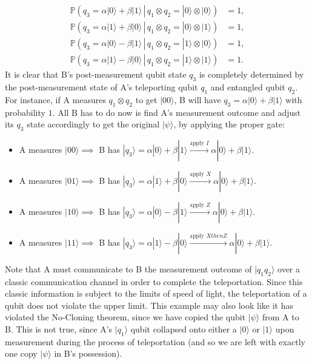\documentclass{article}
\theoremstyle{definition}
\begin{document}
\begin{enumerate}
    \begin{align*}
      \mathbb{P}(q_3 = \alpha|0\rangle + \beta |1\rangle \,|\, q_1 \otimes q_2 = |0\rangle \otimes |0\rangle) &= 1, \\
      \mathbb{P}(q_3 = \alpha|1\rangle + \beta |0\rangle \,|\, q_1 \otimes q_2 = |0\rangle \otimes |1\rangle) &= 1, \\
      \mathbb{P}(q_3 = \alpha|0\rangle - \beta |1\rangle \,|\, q_1 \otimes q_2 = |1\rangle \otimes |0\rangle) &= 1, \\
      \mathbb{P}(q_3 = \alpha|1\rangle - \beta |0\rangle \,|\, q_1 \otimes q_2 = |1\rangle \otimes |1\rangle) &= 1.
    \end{align*}
    It is clear that B's post-measurement qubit state $q_3$ is completely determined by the post-measurement state of A's teleporting qubit $q_1$ and entangled qubit $q_2$. For instance, if A measures $q_1 \otimes q_2$ to get $|00\rangle$, B will have $q_3 = \alpha |0\rangle + \beta |1\rangle$ with probability $1$. All B has to do now is find A's measurement outcome and adjust its $q_3$ state accordingly to get the original $|\psi\rangle$, by applying the proper gate:
    \begin{itemize}
      \item A measures $|00\rangle \implies $ B has $|q_3\rangle = \alpha |0\rangle + \beta |1\rangle \xrightarrow{\text{apply }I} \alpha |0\rangle + \beta |1\rangle$.
      \item A measures $|01\rangle \implies $ B has $|q_3\rangle = \alpha |1\rangle + \beta |0\rangle \xrightarrow{\text{apply }X} \alpha |0\rangle + \beta |1\rangle$.
      \item A measures $|10\rangle \implies $ B has $|q_3\rangle = \alpha |0\rangle - \beta |1\rangle \xrightarrow{\text{apply }Z} \alpha |0\rangle + \beta |1\rangle$.
      \item A measures $|11\rangle \implies $ B has $|q_3\rangle = \alpha |1\rangle - \beta |0\rangle \xrightarrow{\text{apply }X then Z} \alpha |0\rangle + \beta |1\rangle$.
    \end{itemize}
\end{enumerate}
Note that A must communicate to B the measurement outcome of $|q_1 q_2 \rangle$ over a classic communication channel in order to complete the teleportation. Since this classic information is subject to the limits of speed of light, the teleportation of a qubit does not violate the upper limit. This example may also look like it has violated the No-Cloning theorem, since we have copied the qubit $|\psi\rangle$ from A to B. This is not true, since A's $|q_1\rangle$ qubit collapsed onto either a $|0\rangle$ or $|1\rangle$ upon measurement during the process of teleportation (and so we are left with exactly one copy $|\psi\rangle$ in B's possession).
\end{document}
